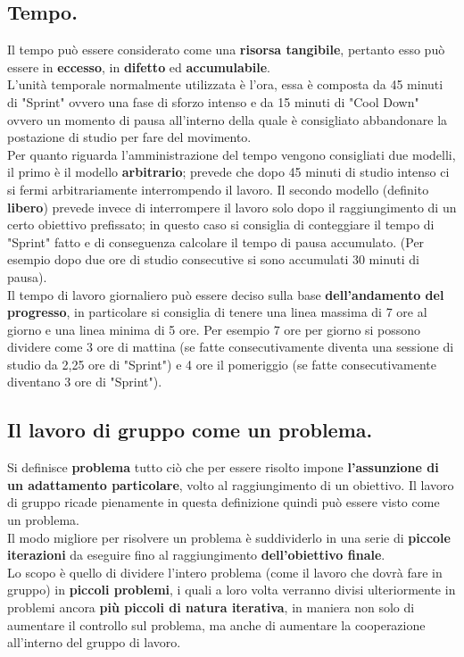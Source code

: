 \documentclass[11pt,a4paper]{article}
\begin{document}
	\subsection{Tempo.}
	 Il tempo può essere considerato come una \textbf{risorsa tangibile}, pertanto esso può essere in \textbf{eccesso}, in \textbf{difetto} ed \textbf{accumulabile}.\\
	L'unità temporale normalmente utilizzata è l'ora, essa è composta da 45 minuti di "Sprint" ovvero una fase di sforzo intenso e da 15 minuti di "Cool Down" ovvero un momento di pausa all'interno della quale è consigliato abbandonare la postazione di studio per fare del movimento. \\
	Per quanto riguarda l'amministrazione del tempo vengono consigliati due modelli, il primo è il  modello \textbf{arbitrario}; prevede che dopo 45 minuti di studio intenso ci si fermi arbitrariamente interrompendo il lavoro. Il secondo modello (definito \textbf{libero}) prevede invece di interrompere il lavoro solo dopo il raggiungimento di un certo obiettivo prefissato; in questo caso si consiglia di conteggiare il tempo di "Sprint" fatto e di conseguenza calcolare il tempo di pausa accumulato. (Per esempio dopo due ore di studio consecutive si sono accumulati 30 minuti di pausa).\\
	Il tempo di lavoro giornaliero può essere deciso sulla base \textbf{dell'andamento del progresso}, in particolare si consiglia di tenere una linea massima di 7 ore al giorno e una linea minima di 5 ore. Per esempio 7 ore per giorno si possono dividere come 3 ore di mattina (se fatte consecutivamente diventa una sessione di studio da 2,25 ore di "Sprint") e 4 ore il pomeriggio (se fatte consecutivamente diventano 3 ore di "Sprint").\\
	
	\subsection{Il lavoro di gruppo come un problema.} 
	Si definisce \textbf{problema} tutto ciò che per essere risolto impone \textbf{l'assunzione di un adattamento particolare}, volto al raggiungimento di un obiettivo. Il lavoro di gruppo ricade pienamente in questa definizione quindi può essere visto come un problema.\\
	Il modo migliore per risolvere un problema è suddividerlo in una serie di \textbf{piccole iterazioni} da eseguire fino al raggiungimento \textbf{dell'obiettivo finale}.\\
	Lo scopo è quello di dividere l'intero problema (come il lavoro che dovrà fare in gruppo) in  \textbf{piccoli problemi}, i quali a loro volta verranno divisi ulteriormente in problemi ancora \textbf{più piccoli di natura iterativa}, in maniera non solo di aumentare il controllo sul problema, ma anche di aumentare la cooperazione all'interno del gruppo di lavoro.\\ 
	
\end{document}
